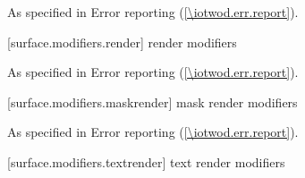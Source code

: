 \begin{itemdecl}
\end{itemdecl}
\begin{itemdescr}
\pnum
\effects


\pnum
\postconditions


\pnum
\throws
As specified in Error reporting (\ref{\iotwod.err.report}).


\pnum
\remarks


\pnum
\errors


\pnum
\realnotes


\end{itemdescr}

 [surface.modifiers.render] { render modifiers}

\begin{itemdecl}
\end{itemdecl}
\begin{itemdescr}
\pnum
\effects

\pnum
\postconditions

\pnum
\throws
As specified in Error reporting (\ref{\iotwod.err.report}).

\pnum
\remarks

\pnum
\errors

\pnum
\realnotes

\end{itemdescr}

 [surface.modifiers.maskrender] { mask render modifiers}

\begin{itemdecl}
\end{itemdecl}
\begin{itemdescr}
\pnum
\effects

\pnum
\postconditions

\pnum
\throws
As specified in Error reporting (\ref{\iotwod.err.report}).

\pnum
\remarks

\pnum
\errors

\pnum
\realnotes

\end{itemdescr}

 [surface.modifiers.textrender] { text render modifiers}

